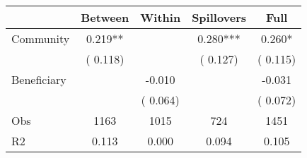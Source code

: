 
\begin{tabular}{l*{4}{c}}\hline&\multicolumn{1}{c}{Between}&\multicolumn{1}{c}{Within}&\multicolumn{1}{c}{Spillovers}&\multicolumn{1}{c}{Full}\\ \hline
 Community             &              0.219**      &                                               &        0.280*** &         0.260*                            \\ 
                               &        (       0.118)           &                                       &       (       0.127)     &      (       0.115)                                           \\ 
 Beneficiary   &                                               &       -0.010    &                                &            -0.031                            \\ 
                               &                                               & (       0.064)                  &                                        &      (       0.072)                                           \\ 
\hline                                                                                                                                                                                                                                            
 Obs                   &               1163               &       1015                       &       724                &              1451                                               \\ 
 R2                    &                      0.113              &              0.000                      &              0.094               &                     0.105                                              \\ 
\hline \end{tabular}                                                                                                                                                                                                              